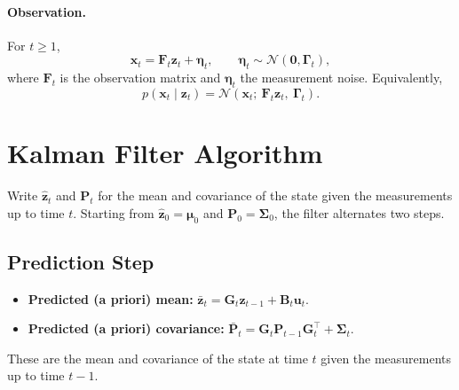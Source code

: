 \paragraph{Observation.} For $t \geq 1$,
\begin{equation*}
    \mathbf{x}_t = \mathbf{F}_t \mathbf{z}_t + \boldsymbol{\eta}_t,
    \qquad
    \boldsymbol{\eta}_t \sim \mathcal{N}(\mathbf{0},
    \boldsymbol{\Gamma}_{t}),
\end{equation*}
where $\mathbf{F}_t$ is the observation matrix and
$\boldsymbol{\eta}_t$ the measurement noise. Equivalently,
\begin{equation}
    p(\mathbf{x}_t \mid \mathbf{z}_t) =
    \mathcal{N}(\mathbf{x}_t;\ \mathbf{F}_t \mathbf{z}_{t},\
    \boldsymbol{\Gamma}_{t}).
    \label{eq:2}
\end{equation}

\section{Kalman Filter Algorithm}

Write $\hat{\mathbf{z}}_{t}$ and $\mathbf{P}_{t}$ for the mean and
covariance of the state given the measurements up to time $t$. Starting
from $\hat{\mathbf{z}}_{0} = \boldsymbol{\mu}_{0}$ and
$\mathbf{P}_{0} = \boldsymbol{\Sigma}_{0}$, the filter alternates two
steps.

\subsection{Prediction Step}
\begin{itemize}
    \item \textbf{Predicted (a priori) mean:}\quad
    $\bar{\mathbf{z}}_{t} = \mathbf{G}_t \hat{\mathbf{z}}_{t-1} +
    \mathbf{B}_t \mathbf{u}_t$.
    \item \textbf{Predicted (a priori) covariance:}\quad
    $\bar{\mathbf{P}}_{t} = \mathbf{G}_t \mathbf{P}_{t-1}
    \mathbf{G}_t^\top + \boldsymbol{\Sigma}_{t}$.
\end{itemize}
These are the mean and covariance of the state at time $t$ given the
measurements up to time $t-1$.


